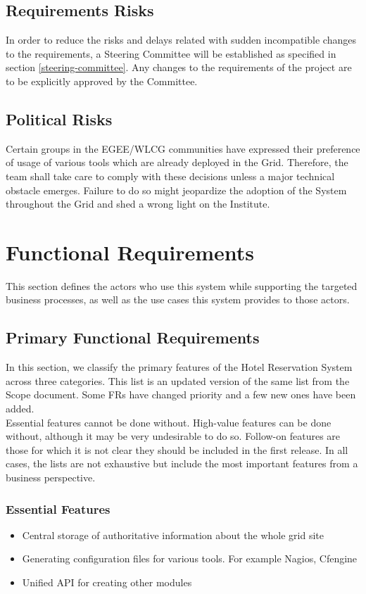 \documentclass[12pt]{article}
\begin{document}
\subsection{Requirements Risks}
In order to reduce the risks and delays related with sudden incompatible changes
to the requirements, a Steering Committee will be established as specified in
section \ref{steering-committee}.  Any changes to the requirements of the
project are to be explicitly approved by the Committee.

\subsection{Political Risks}
Certain groups in the EGEE/WLCG communities have expressed their preference of
usage of various tools which are already deployed in the Grid.  Therefore, the
team shall take care to comply with these decisions unless a major technical
obstacle emerges.  Failure to do so might jeopardize the adoption of the System
throughout the Grid and shed a wrong light on the Institute.


\section{Functional Requirements}
This section defines the actors who use this system while supporting the targeted business processes, as well as the use cases this 
system provides to those actors.

\subsection{Primary Functional Requirements}
In this section, we classify the primary features of the Hotel Reservation System across three categories. This list is an updated 
version of the same list from the Scope document. Some FRs have changed priority and a few new ones have been added.\\
Essential features cannot be done without. High-value features can be done without, although it may be very undesirable to 
do so. Follow-on features are those for which it is not clear they should be included in the first release. In all cases, 
the lists are not exhaustive but include the most important features from a business perspective.

\subsubsection{Essential Features}
\begin{itemize}
	\item Central storage of authoritative information about the whole grid site
	\item Generating configuration files for various tools. For example Nagios, Cfengine
	\item Unified API for creating other modules
\end{itemize}
\end{document}
